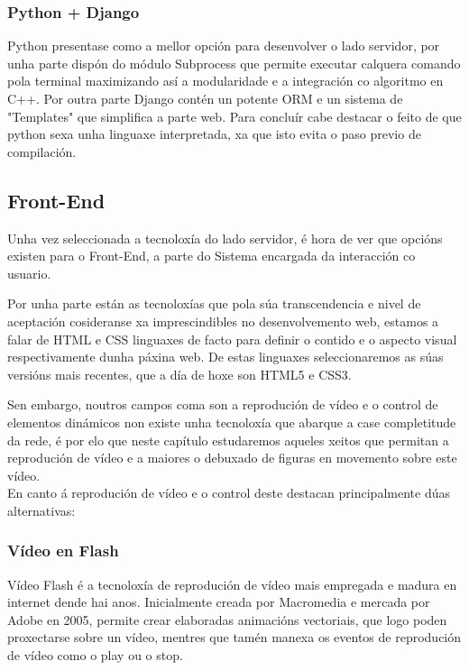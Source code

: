         \subsubsection{Python + Django}
        Python presentase como a mellor opción para desenvolver o lado servidor, por unha parte
        dispón do módulo Subprocess\cite{subprocess-module-url} que permite executar calquera
        comando pola terminal maximizando así a modularidade e a integración co algoritmo en C++.
        Por outra parte Django\cite{django-web-page-url} contén un potente ORM e un sistema de 
        "Templates" que simplifica a parte web. Para concluír cabe destacar o feito de que 
        python sexa unha linguaxe interpretada, xa que isto evita o paso previo de compilación.
        
        
    \subsection{Front-End}
        Unha vez seleccionada a tecnoloxía do lado servidor, é hora de ver que opcións existen para
        o Front-End, a parte do Sistema encargada da interacción co usuario.
        
        Por unha parte están as tecnoloxías que pola súa transcendencia e nivel de aceptación
        cosideranse xa imprescindibles no desenvolvemento web, estamos a falar de HTML e CSS linguaxes
        de facto para definir o contido e o aspecto visual respectivamente dunha páxina web.
        De estas linguaxes seleccionaremos as súas versións mais recentes, que a día de hoxe son HTML5 e
        CSS3.
        
        Sen embargo, noutros campos coma son a reprodución de vídeo e o control de elementos dinámicos
        non existe unha tecnoloxía que abarque a case completitude da rede, é por elo que neste capítulo
        estudaremos aqueles xeitos que permitan a reprodución de vídeo e a maiores o debuxado de 
        figuras en movemento sobre este vídeo.\\
        
        En canto á reprodución de vídeo e o control deste destacan principalmente dúas alternativas:
        
        \subsubsection{Vídeo en Flash}
            Vídeo Flash é a tecnoloxía de reprodución de vídeo mais empregada e madura en
            internet dende hai anos. Inicialmente creada por Macromedia e mercada por Adobe 
            en 2005, permite crear elaboradas animacións vectoriais, que logo poden proxectarse
            sobre un vídeo, mentres que tamén manexa os eventos de reprodución de vídeo como o 
            play ou o stop.\\
            
